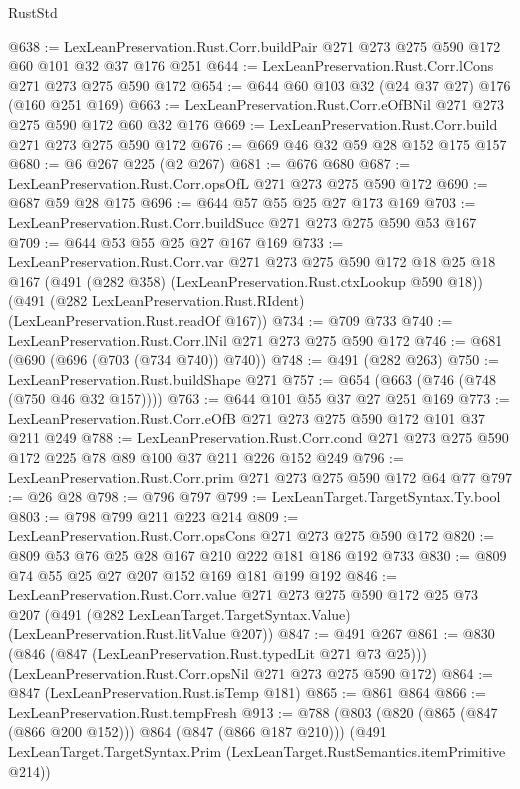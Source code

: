 \begin{lexlean}{RustStd}
\begin{coremodule}
@638 := LexLeanPreservation.Rust.Corr.buildPair @271 @273 @275 @590 @172 @60 @101 @32 @37 @176 @251
@644 := LexLeanPreservation.Rust.Corr.lCons @271 @273 @275 @590 @172
@654 := @644 @60 @103 @32 (@24 @37 @27) @176 (@160 @251 @169)
@663 := LexLeanPreservation.Rust.Corr.eOfBNil @271 @273 @275 @590 @172 @60 @32 @176
@669 := LexLeanPreservation.Rust.Corr.build @271 @273 @275 @590 @172
@676 := @669 @46 @32 @59 @28 @152 @175 @157
@680 := @6 @267 @225 (@2 @267)
@681 := @676 @680
@687 := LexLeanPreservation.Rust.Corr.opsOfL @271 @273 @275 @590 @172
@690 := @687 @59 @28 @175
@696 := @644 @57 @55 @25 @27 @173 @169
@703 := LexLeanPreservation.Rust.Corr.buildSucc @271 @273 @275 @590 @53 @167
@709 := @644 @53 @55 @25 @27 @167 @169
@733 := LexLeanPreservation.Rust.Corr.var
    @271
    @273
    @275
    @590
    @172
    @18
    @25
    @18
    @167
    (@491 (@282 @358) (LexLeanPreservation.Rust.ctxLookup @590 @18))
    (@491 (@282 LexLeanPreservation.Rust.RIdent) (LexLeanPreservation.Rust.readOf @167))
@734 := @709 @733
@740 := LexLeanPreservation.Rust.Corr.lNil @271 @273 @275 @590 @172
@746 := @681 (@690 (@696 (@703 (@734 @740)) @740))
@748 := @491 (@282 @263)
@750 := LexLeanPreservation.Rust.buildShape @271
@757 := @654 (@663 (@746 (@748 (@750 @46 @32 @157))))
@763 := @644 @101 @55 @37 @27 @251 @169
@773 := LexLeanPreservation.Rust.Corr.eOfB @271 @273 @275 @590 @172 @101 @37 @211 @249
@788 := LexLeanPreservation.Rust.Corr.cond
    @271
    @273
    @275
    @590
    @172
    @225
    @78
    @89
    @100
    @37
    @211
    @226
    @152
    @249
@796 := LexLeanPreservation.Rust.Corr.prim @271 @273 @275 @590 @172 @64 @77
@797 := @26 @28
@798 := @796 @797
@799 := LexLeanTarget.TargetSyntax.Ty.bool
@803 := @798 @799 @211 @223 @214
@809 := LexLeanPreservation.Rust.Corr.opsCons @271 @273 @275 @590 @172
@820 := @809 @53 @76 @25 @28 @167 @210 @222 @181 @186 @192 @733
@830 := @809 @74 @55 @25 @27 @207 @152 @169 @181 @199 @192
@846 := LexLeanPreservation.Rust.Corr.value
    @271
    @273
    @275
    @590
    @172
    @25
    @73
    @207
    (@491 (@282 LexLeanTarget.TargetSyntax.Value) (LexLeanPreservation.Rust.litValue @207))
@847 := @491 @267
@861 := @830
    (@846 (@847 (LexLeanPreservation.Rust.typedLit @271 @73 @25)))
    (LexLeanPreservation.Rust.Corr.opsNil @271 @273 @275 @590 @172)
@864 := @847 (LexLeanPreservation.Rust.isTemp @181)
@865 := @861 @864
@866 := LexLeanPreservation.Rust.tempFresh
@913 := @788
    (@803
      (@820 (@865 (@847 (@866 @200 @152))) @864 (@847 (@866 @187 @210)))
      (@491 LexLeanTarget.TargetSyntax.Prim (LexLeanTarget.RustSemantics.itemPrimitive @214))

\end{coremodule}
\end{lexlean}
